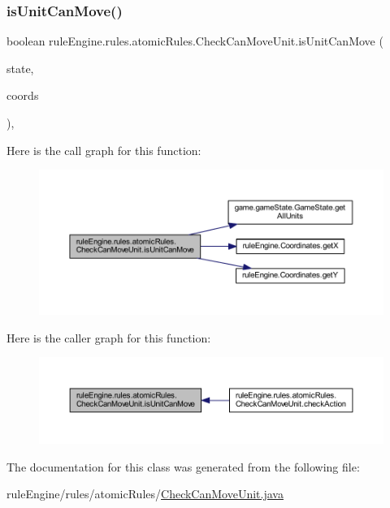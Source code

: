 \subsubsection{\texorpdfstring{is\+Unit\+Can\+Move()}{isUnitCanMove()}}
{\footnotesize\ttfamily boolean rule\+Engine.\+rules.\+atomic\+Rules.\+Check\+Can\+Move\+Unit.\+is\+Unit\+Can\+Move (\begin{DoxyParamCaption}\item[{\mbox{\hyperlink{classgame_1_1game_state_1_1_game_state}{Game\+State}}}]{state,  }\item[{\mbox{\hyperlink{classrule_engine_1_1_coordinates}{Coordinates}}}]{coords }\end{DoxyParamCaption})\hspace{0.3cm}{\ttfamily [inline]}, {\ttfamily [private]}}

Here is the call graph for this function\+:
\nopagebreak
\begin{figure}[H]
\begin{center}
\leavevmode
\includegraphics[width=350pt]{classrule_engine_1_1rules_1_1atomic_rules_1_1_check_can_move_unit_aecbc116d3a1af14548f7aa75533b23be_cgraph}
\end{center}
\end{figure}
Here is the caller graph for this function\+:
\nopagebreak
\begin{figure}[H]
\begin{center}
\leavevmode
\includegraphics[width=350pt]{classrule_engine_1_1rules_1_1atomic_rules_1_1_check_can_move_unit_aecbc116d3a1af14548f7aa75533b23be_icgraph}
\end{center}
\end{figure}


The documentation for this class was generated from the following file\+:\begin{DoxyCompactItemize}
\item 
rule\+Engine/rules/atomic\+Rules/\mbox{\hyperlink{_check_can_move_unit_8java}{Check\+Can\+Move\+Unit.\+java}}\end{DoxyCompactItemize}
